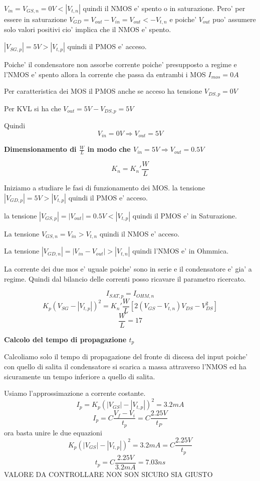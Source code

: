 \documentclass[\main/main.tex]{subfiles}
\begin{document}
$V_{in} = V_{GS,n} = 0V < |V_{t,n}|$ quindi il NMOS e' spento o in saturazione.
Pero' per essere in saturazione $V_{GD} = V_{out} - V_{in} = V_{out} < -V_{t,n}$
e poiche' $V_{out}$ puo' assumere solo valori positivi cio' implica che il NMOS e' spento.

$|V_{SG,p}| = 5V > |V_{t,p}|$ quindi il PMOS e' acceso.

Poiche' il condensatore non assorbe corrente poiche' presupposto a regime e l'NMOS e' spento allora la corrente che passa da entrambi i MOS $I_{mos} = 0A$

Per caratteristica dei MOS il PMOS anche se acceso ha tensione $V_{DS,p} = 0V$

Per KVL si ha che $V_{out} = 5V - V_{DS,p} = 5V$

Quindi \[ V_{in} = 0V \Rightarrow V_{out} = 5V\]

\textbf{Dimensionamento di $\frac{W}{L}$ in modo che $V_{in} = 5V \Rightarrow V_{out} = 0.5V$}

\[ K_n = K_n' \frac{W}{L} \]

Iniziamo a studiare le fasi di funzionamento dei MOS.
la tensione $|V_{GD,p}| = 5V > |V_{t,p}|$ quindi il PMOS e' acceso.

la tensione $|V_{GS,p}| = |V_{out}| = 0.5V < |V_{t,p}|$ quindi il PMOS e' in Saturazione.

La tensione $V_{GS,n} = V_{in} > V_{t,n}$ quindi il NMOS e' acceso.

La tensione $|V_{GD,n}| = |V_{in} - V_{out}| > |V_{t,n}|$ quindi l'NMOS e' in Ohmmica.

La corrente dei due mos e' uguale poiche' sono in serie e il condensatore e' gia' a regime.
Quindi dal bilancio delle correnti posso ricavare il parametro ricercato.

\[I_{SAT,p} = I_{OHM,n}\]
\[K_p \left(V_{SG} - |V_{t,p}| \right)^2 = K_n' \frac{W}{L} \left[ 2 \left( V_{GS} - V_{t,n} \right) V_{DS} - V_{DS}^2 \right]\]
\[\frac{W}{L} = 17\]

\textbf{Calcolo del tempo di propagazione $t_p$}

Calcoliamo solo il tempo di propagazione del fronte di discesa del input poiche' con quello di salita il condensatore si scarica a massa attraverso l'NMOS ed ha sicuramente un tempo inferiore a quello di salita.

Usiamo l'approssimazione a corrente costante.
\[I_p = K_p \left(|V_{GS}| - |V_{t,p}| \right)^2 = 3.2mA\]
\[I_p = C \frac{V_f - V_i}{t_p} = C \frac{2.25V}{t_P}\]
ora basta unire le due equazioni
\[ K_p \left(|V_{GS}| - |V_{t,p}| \right)^2 = 3.2mA = C \frac{2.25V}{t_p}\]
\[t_p = C \frac{2.25V}{3.2mA} = 7.03ns\]
VALORE DA CONTROLLARE NON SON SICURO SIA GIUSTO
\end{document}

